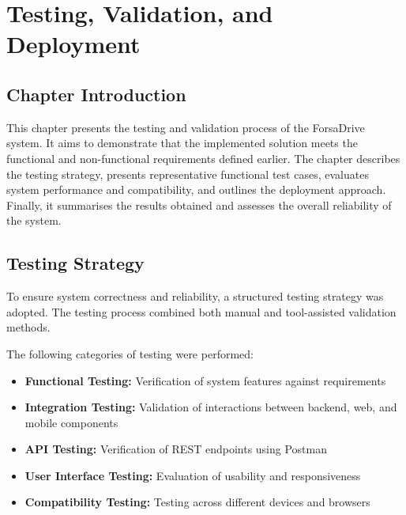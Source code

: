 \chapter{Testing, Validation, and Deployment}

\section*{Chapter Introduction}

This chapter presents the testing and validation process of the ForsaDrive system. It aims to demonstrate that the implemented solution meets the functional and non-functional requirements defined earlier. The chapter describes the testing strategy, presents representative functional test cases, evaluates system performance and compatibility, and outlines the deployment approach. Finally, it summarises the results obtained and assesses the overall reliability of the system.

\section{Testing Strategy}

To ensure system correctness and reliability, a structured testing strategy was adopted. The testing process combined both manual and tool-assisted validation methods.

The following categories of testing were performed:

\begin{itemize}[noitemsep]
    \item \textbf{Functional Testing:} Verification of system features against requirements
    \item \textbf{Integration Testing:} Validation of interactions between backend, web, and mobile components
    \item \textbf{API Testing:} Verification of REST endpoints using Postman
    \item \textbf{User Interface Testing:} Evaluation of usability and responsiveness
    \item \textbf{Compatibility Testing:} Testing across different devices and browsers
\end{itemize}

